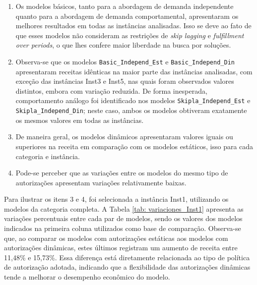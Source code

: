 \begin{enumerate}
	\item Os modelos básicos, tanto para a abordagem de demanda independente quanto para a abordagem de demanda comportamental, apresentaram os melhores resultados em todas as instâncias analisadas. Isso se deve ao fato de que esses modelos não consideram as restrições de \textit{skip lagging} e \textit{fulfillment over periods}, o que lhes confere maior liberdade na busca por soluções.

	\item Observa-se que os modelos \texttt{Basic\_Independ\_Est} e \texttt{Basic\_Independ\_Din} apresentaram receitas idênticas na maior parte das instâncias analisadas, com exceção das instâncias Inst3 e Inst5, nas quais foram observados valores distintos, embora com variação reduzida. De forma inesperada, comportamento análogo foi identificado nos modelos \texttt{Skipla\_Independ\_Est} e \texttt{Skipla\_Independ\_Din}; neste caso, ambos os modelos obtiveram exatamente os mesmos valores em todas as instâncias.


	\item De maneira geral, os modelos dinâmicos apresentaram valores iguais ou superiores na receita em comparação com os modelos estáticos, isso para cada categoria e instância.

	\item Pode-se perceber que as variações entre os modelos do mesmo tipo de autorizações apresentam variações relativamente baixas.
\end{enumerate}

Para ilustrar os itens 3 e 4, foi selecionada a instância Inst1, utilizando os modelos da categoria completa. A Tabela \ref{tab: variaciones_Inst1} apresenta as variações percentuais entre cada par de modelos, sendo os valores dos modelos indicados na primeira coluna utilizados como base de comparação. Observa-se que, ao comparar os modelos com autorizações estáticas aos modelos com autorizações dinâmicas, estes últimos registram um aumento de receita entre 11,48\% e 15,73\%. Essa diferença está diretamente relacionada ao tipo de política de autorização adotada, indicando que a flexibilidade das autorizações dinâmicas tende a melhorar o desempenho econômico do modelo.


